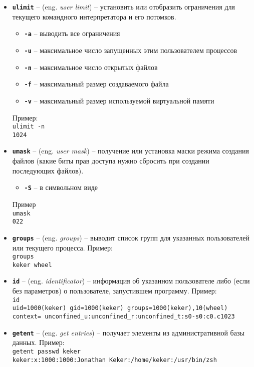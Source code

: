 \documentclass[12pt, a4paper]{article}
\begin{document}
\begin{itemize}
  \item \textbf{\texttt{ulimit}} -- (eng. \textit{user limit}) -- установить или
    отобразить ограничения для текущего командного интерпретатора и его потомков.
  \begin{itemize}
    \item \textbf{\texttt{-a}} -- выводить все ограничения
    \item \textbf{\texttt{-u}} -- максимальное число запущенных этим
     пользователем процессов
    \item \textbf{\texttt{-n}} -- максимальное число открытых файлов
    \item \textbf{\texttt{-f}} -- максимальный размер создаваемого файла
    \item \textbf{\texttt{-v}} -- максимальный размер используемой виртуальной
      памяти
  \end{itemize}
  Пример:\\\texttt{ulimit -n\\1024}
  \item \textbf{\texttt{umask}} -- (eng. \textit{user mask}) -- получение или
    установка маски режима создания файлов (какие биты прав доступа нужно сбросить
    при создании последующих файлов).
  \begin{itemize}
    \item \textbf{\texttt{-S}} -- в символьном виде
  \end{itemize}
  Пример\\\texttt{umask\\022}
  \item \textbf{\texttt{groups}} -- (eng. \textit{groups}) -- выводит список
    групп для указанных пользователей или текущего процесса.
  Пример:\\\texttt{groups\\keker wheel}
  \item \textbf{\texttt{id}} -- (eng. \textit{identificator}) -- информация об
    указанном пользователе либо (если без параметров) о пользователе,
    запустившем программу.
  Пример:\\\texttt{id}\\
  \texttt{uid=1000(keker) gid=1000(keker) groups=1000(keker),10(wheel) context=
    unconfined\_u:unconfined\_r:unconfined\_t:s0-s0:c0.c1023}
  \item \textbf{\texttt{getent}} -- (eng. \textit{get entries}) -- получает
    элементы из административной базы данных.
  Пример:\\\texttt{getent passwd keker\\keker:x:1000:1000:Jonathan Keker:/home/keker:/usr/bin/zsh}

\end{itemize}
\end{document}
